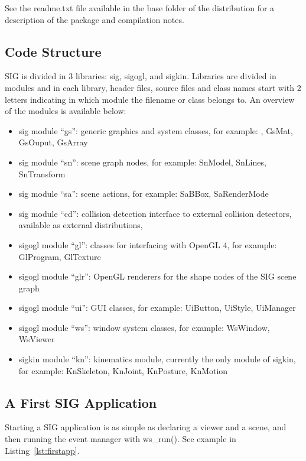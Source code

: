 See the readme.txt file available in the base folder of the distribution for a description of the package and compilation notes.


\subsection{Code Structure}
SIG is divided in 3 libraries: sig, sigogl, and sigkin. Libraries are divided in modules and in each library, header files, source files and class names start with 2 letters indicating in which module the filename or class belongs to. An overview of the modules is available below:

\begin{itemize}
    \item sig module ``gs'': generic graphics and system classes, for example: , GsMat, GsOuput, GsArray
    \item sig module ``sn'': scene graph nodes, for example: SnModel, SnLines, SnTransform
    \item sig module ``sa'': scene actions, for example: SaBBox, SaRenderMode
    \item sig module ``cd'': collision detection interface to external collision detectors, available as external distributions,
    \item sigogl module ``gl'': classes for interfacing with OpenGL 4, for example: GlProgram, GlTexture
    \item sigogl module ``glr'': OpenGL renderers for the shape nodes of the SIG scene graph
    \item sigogl module ``ui'': GUI classes, for example: UiButton, UiStyle, UiManager
    \item sigogl module ``ws'': window system classes, for example: WsWindow, WsViewer
    \item sigkin module ``kn'': kinematics module, currently the only module of sigkin, for example: KnSkeleton, KnJoint, KnPosture, KnMotion
\end{itemize}

\subsection{A First SIG Application}

Starting a SIG application is as simple as declaring a viewer and a scene, and then running the event manager with ws\_run(). See example in Listing~\ref{lst:firstapp}.

